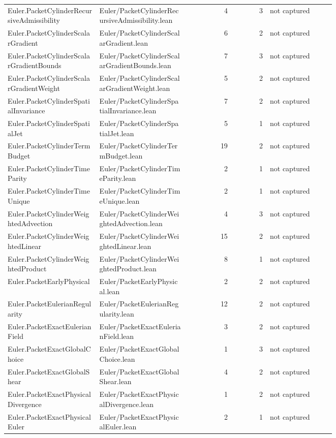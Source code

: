 \documentclass[10pt]{article}
\begin{document}
\begin{longtable}{p{0.28\linewidth}p{0.27\linewidth}r r p{0.20\linewidth}}
Euler.PacketCylinderRecursiveAdmissibility & Euler/PacketCylinderRecursiveAdmissibility.lean & 4 & 3 & not captured\\
Euler.PacketCylinderScalarGradient & Euler/PacketCylinderScalarGradient.lean & 6 & 2 & not captured\\
Euler.PacketCylinderScalarGradientBounds & Euler/PacketCylinderScalarGradientBounds.lean & 7 & 3 & not captured\\
Euler.PacketCylinderScalarGradientWeight & Euler/PacketCylinderScalarGradientWeight.lean & 5 & 2 & not captured\\
Euler.PacketCylinderSpatialInvariance & Euler/PacketCylinderSpatialInvariance.lean & 7 & 2 & not captured\\
Euler.PacketCylinderSpatialJet & Euler/PacketCylinderSpatialJet.lean & 5 & 1 & not captured\\
Euler.PacketCylinderTermBudget & Euler/PacketCylinderTermBudget.lean & 19 & 2 & not captured\\
Euler.PacketCylinderTimeParity & Euler/PacketCylinderTimeParity.lean & 2 & 1 & not captured\\
Euler.PacketCylinderTimeUnique & Euler/PacketCylinderTimeUnique.lean & 2 & 1 & not captured\\
Euler.PacketCylinderWeightedAdvection & Euler/PacketCylinderWeightedAdvection.lean & 4 & 3 & not captured\\
Euler.PacketCylinderWeightedLinear & Euler/PacketCylinderWeightedLinear.lean & 15 & 2 & not captured\\
Euler.PacketCylinderWeightedProduct & Euler/PacketCylinderWeightedProduct.lean & 8 & 1 & not captured\\
Euler.PacketEarlyPhysical & Euler/PacketEarlyPhysical.lean & 2 & 2 & not captured\\
Euler.PacketEulerianRegularity & Euler/PacketEulerianRegularity.lean & 12 & 2 & not captured\\
Euler.PacketExactEulerianField & Euler/PacketExactEulerianField.lean & 3 & 2 & not captured\\
Euler.PacketExactGlobalChoice & Euler/PacketExactGlobalChoice.lean & 1 & 3 & not captured\\
Euler.PacketExactGlobalShear & Euler/PacketExactGlobalShear.lean & 4 & 2 & not captured\\
Euler.PacketExactPhysicalDivergence & Euler/PacketExactPhysicalDivergence.lean & 1 & 2 & not captured\\
Euler.PacketExactPhysicalEuler & Euler/PacketExactPhysicalEuler.lean & 2 & 1 & not captured\\

\end{longtable}
\end{document}
